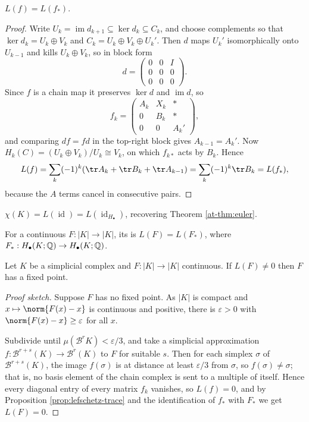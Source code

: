 \documentclass[a4paper]{scrartcl}
\newcommand{\id}{\operatorname{id}}
\newcommand{\bary}{\mathcal{B}}
\begin{document}
\begin{proposition} \label{prop:lefschetz-trace}
	$L(f) = L(f_*)$.
\end{proposition}
\begin{proof}
	Write $U_k = \operatorname{im}d_{k+1}\subseteq \ker d_k\subseteq C_k$, and choose complements so that $\ker d_k = U_k\oplus V_k$ and $C_k = U_k\oplus V_k\oplus U_k'$. Then $d$ maps $U_k'$ isomorphically onto $U_{k-1}$ and kills $U_k\oplus V_k$, so in block form
	$$
	d = \begin{pmatrix}0&0&I\\0&0&0\\0&0&0\end{pmatrix}.
	$$
	Since $f$ is a chain map it preserves $\ker d$ and $\operatorname{im}d$, so
	$$
	f_k = \begin{pmatrix}A_k & X_k & *\\ 0 & B_k & *\\ 0&0&A_k'\end{pmatrix},
	$$
	and comparing $df = fd$ in the top-right block gives $A_{k-1} = A_k'$. Now $H_k(C) = (U_k\oplus V_k)/U_k \cong V_k$, on which $f_{k*}$ acts by $B_k$. Hence
	$$
	L(f) = \sum_k(-1)^k(\tr A_k + \tr B_k + \tr A_{k-1}) = \sum_k(-1)^k\tr B_k = L(f_*),
	$$
	because the $A$ terms cancel in consecutive pairs.
\end{proof}

\begin{corollary}
	$\chi(K) = L(\id) = L(\id_{H_\bullet})$, recovering Theorem \ref{at-thm:euler}.
\end{corollary}

\begin{definition}
	For a continuous $F: |K|\to|K|$, its  is $L(F) = L(F_*)$, where $F_*: H_\bullet(K;\mathbb{Q})\to H_\bullet(K;\mathbb{Q})$.
\end{definition}

\begin{theorem} \label{thm:lefschetz}
	Let $K$ be a simplicial complex and $F: |K|\to|K|$ continuous. If $L(F)\neq 0$ then $F$ has a fixed point.
\end{theorem}
\begin{proof}[Proof sketch]
	Suppose $F$ has no fixed point. As $|K|$ is compact and $x \mapsto \norm{F(x)-x}$ is continuous and positive, there is $\varepsilon>0$ with $\norm{F(x)-x}\geq\varepsilon$ for all $x$.

	Subdivide until $\mu(\bary^r K) < \varepsilon/3$, and take a simplicial approximation $f: \bary^{r+s}(K)\to\bary^r(K)$ to $F$ for suitable $s$. Then for each simplex $\sigma$ of $\bary^{r+s}(K)$, the image $f(\sigma)$ is at distance at least $\varepsilon/3$ from $\sigma$, so $f(\sigma)\neq\sigma$; that is, no basis element of the chain complex is sent to a multiple of itself. Hence every diagonal entry of every matrix $f_k$ vanishes, so $L(f) = 0$, and by Proposition \ref{prop:lefschetz-trace} and the identification of $f_*$ with $F_*$ we get $L(F) = 0$.
\end{proof}
\end{document}
